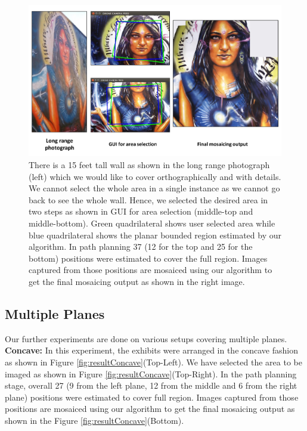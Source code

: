 \begin{figure}
\centering
\includegraphics[width=\linewidth]{figures/multiplanar/ladyResult.pdf}
\caption[Result: Single planar scene]{There is a 15 feet tall wall as shown in
the long range photograph (left) which we would like to cover orthographically and with details. We cannot
select the whole area in a single instance as we cannot go back to see the whole
wall. Hence, we selected the desired area in two steps as shown in GUI for area
selection (middle-top and middle-bottom). Green quadrilateral shows user selected area
while blue quadrilateral shows the planar bounded region estimated by our
algorithm. In path planning 37 (12 for the top and 25 for the bottom) positions were
estimated to cover the full region. Images captured from those positions are
mosaiced using our algorithm to get the final mosaicing output as shown in the
right image.}
\label{fig:resultLady}
\end{figure}

\subsection{Multiple Planes}
Our further experiments are done on various setups covering multiple planes.\\

\textbf{Concave:} In this experiment, the exhibits were arranged in the concave
fashion as shown in Figure \ref{fig:resultConcave}(Top-Left). We have selected
the area to be imaged as shown in Figure \ref{fig:resultConcave}(Top-Right). In
the path planning stage, overall 27 (9 from the left plane, 12 from the middle and 6
from the right plane) positions were estimated to cover full region. Images captured
from those positions are mosaiced using our algorithm to get the final mosaicing
output as shown in the Figure \ref{fig:resultConcave}(Bottom).

